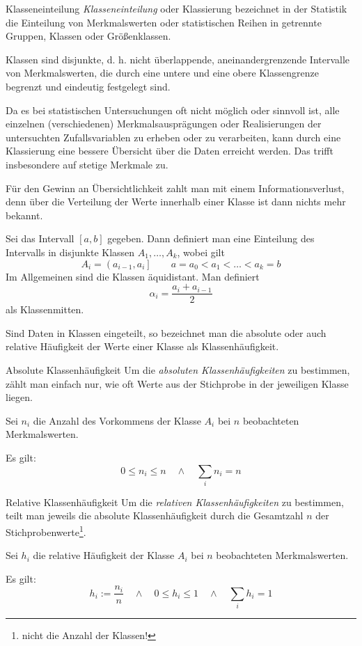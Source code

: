 \begin{defi}{Klasseneinteilung}
    \emph{Klasseneinteilung} oder Klassierung bezeichnet in der Statistik die Einteilung von Merkmalswerten oder statistischen Reihen in getrennte Gruppen, Klassen oder Größenklassen.

    Klassen sind disjunkte, d. h. nicht überlappende, aneinandergrenzende Intervalle von Merkmalswerten, die durch eine untere und eine obere Klassengrenze begrenzt und eindeutig festgelegt sind.

    Da es bei statistischen Untersuchungen oft nicht möglich oder sinnvoll ist, alle einzelnen (verschiedenen) Merkmalsausprägungen oder Realisierungen der untersuchten Zufallsvariablen zu erheben oder zu verarbeiten, kann durch eine Klassierung eine bessere Übersicht über die Daten erreicht werden.
    Das trifft insbesondere auf stetige Merkmale zu.

    Für den Gewinn an Übersichtlichkeit zahlt man mit einem Informationsverlust, denn über die Verteilung der Werte innerhalb einer Klasse ist dann nichts mehr bekannt.

    Sei das Intervall $[a,b]$ gegeben.
    Dann definiert man eine Einteilung des Intervalls in disjunkte Klassen $A_1, \ldots, A_k$, wobei gilt
    \[
        A_i = \left( a_{i-1}, a_i \right] \qquad a = a_0 < a_1 < \ldots < a_k = b
    \]
    Im Allgemeinen sind die Klassen äquidistant.
    Man definiert
    \[
        \alpha_i = \frac{a_i + a_{i-1}}{2}
    \]
    als Klassenmitten.

    Sind Daten in Klassen eingeteilt, so bezeichnet man die absolute oder auch relative Häufigkeit der Werte einer Klasse als Klassenhäufigkeit.
\end{defi}

\begin{defi}{Absolute Klassenhäufigkeit}
    Um die \emph{absoluten Klassenhäufigkeiten} zu bestimmen, zählt man einfach nur, wie oft Werte aus der Stichprobe in der jeweiligen Klasse liegen.

    Sei $n_i$ die Anzahl des Vorkommens der Klasse $A_i$ bei $n$ beobachteten Merkmalswerten.

    Es gilt:
    \[
        0 \leq n_i \leq n \quad \land \quad \sum_i n_i = n
    \]
\end{defi}

\begin{defi}{Relative Klassenhäufigkeit}
    Um die \emph{relativen Klassenhäufigkeiten} zu bestimmen, teilt man jeweils die absolute Klassenhäufigkeit durch die Gesamtzahl $n$ der Stichprobenwerte\footnote{nicht die Anzahl der Klassen!}.

    Sei $h_i$ die relative Häufigkeit der Klasse $A_i$ bei $n$ beobachteten Merkmalswerten.

    Es gilt:
    \[
        h_i := \frac{n_i}{n} \quad \land \quad 0 \leq h_i \leq 1 \quad \land \quad \sum_i h_i = 1
    \]
\end{defi}


